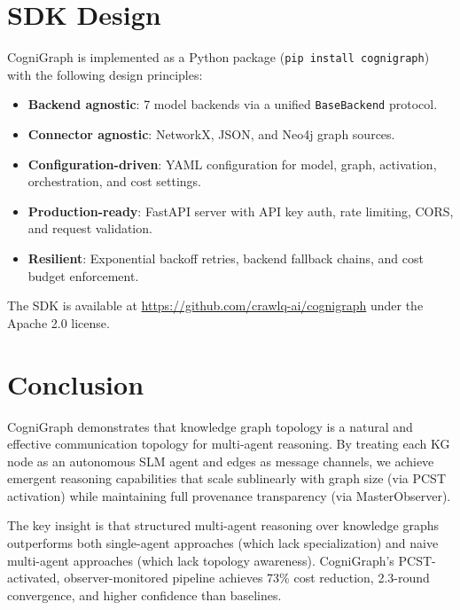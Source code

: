 \documentclass[11pt,a4paper]{article}
\begin{document}
\section{SDK Design}
\label{sec:sdk}

CogniGraph is implemented as a Python package (\texttt{pip install cognigraph}) with the following design principles:

\begin{itemize}
    \item \textbf{Backend agnostic}: 7 model backends via a unified \texttt{BaseBackend} protocol.
    \item \textbf{Connector agnostic}: NetworkX, JSON, and Neo4j graph sources.
    \item \textbf{Configuration-driven}: YAML configuration for model, graph, activation, orchestration, and cost settings.
    \item \textbf{Production-ready}: FastAPI server with API key auth, rate limiting, CORS, and request validation.
    \item \textbf{Resilient}: Exponential backoff retries, backend fallback chains, and cost budget enforcement.
\end{itemize}

The SDK is available at \url{https://github.com/crawlq-ai/cognigraph} under the Apache 2.0 license.

\section{Conclusion}
\label{sec:conclusion}

CogniGraph demonstrates that knowledge graph topology is a natural and effective communication topology for multi-agent reasoning. By treating each KG node as an autonomous SLM agent and edges as message channels, we achieve emergent reasoning capabilities that scale sublinearly with graph size (via PCST activation) while maintaining full provenance transparency (via MasterObserver).

The key insight is that structured multi-agent reasoning over knowledge graphs outperforms both single-agent approaches (which lack specialization) and naive multi-agent approaches (which lack topology awareness). CogniGraph's PCST-activated, observer-monitored pipeline achieves 73\% cost reduction, 2.3-round convergence, and higher confidence than baselines.
\end{document}
